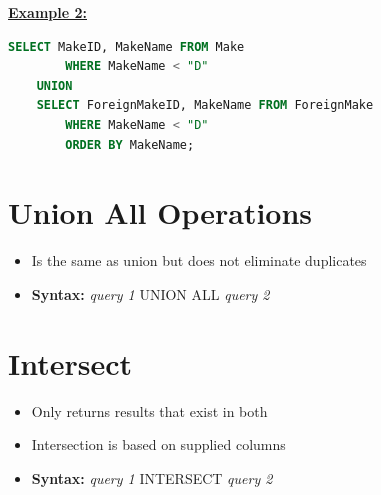 \documentclass[12pt]{article}
\begin{document}
\begin{itemize}
    \bigskip

    \underline{\textbf{Example 2:}}

    \bigskip

    \begin{lstlisting}[language=SQL]
    SELECT MakeID, MakeName FROM Make
        WHERE MakeName < "D"
    UNION
    SELECT ForeignMakeID, MakeName FROM ForeignMake
        WHERE MakeName < "D"
        ORDER BY MakeName;
    \end{lstlisting}

\end{itemize}

\bigskip

\section{Union All Operations}

\bigskip

\begin{itemize}
    \item Is the same as union but does not eliminate duplicates
    \item \textbf{Syntax:} \textit{query 1} UNION ALL \textit{query 2}
\end{itemize}

\bigskip

\section{Intersect}

\bigskip

\begin{itemize}
    \item Only returns results that exist in both
    \item Intersection is based on supplied columns
    \item \textbf{Syntax:} \textit{query 1} INTERSECT \textit{query 2}
\end{itemize}
\end{document}
